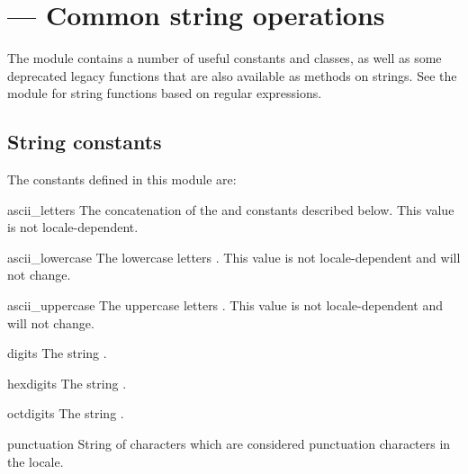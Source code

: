 \section{ ---
         Common string operations}


The  module contains a number of useful constants and classes,
as well as some deprecated legacy functions that are also available as methods
on strings.  See the module  for string
functions based on regular expressions.

\subsection{String constants}

The constants defined in this module are:

\begin{datadesc}{ascii\_letters}
  The concatenation of the  and
   constants described below.  This value is
  not locale-dependent.
\end{datadesc}

\begin{datadesc}{ascii\_lowercase}
  The lowercase letters .  This
  value is not locale-dependent and will not change.
\end{datadesc}

\begin{datadesc}{ascii\_uppercase}
  The uppercase letters .  This
  value is not locale-dependent and will not change.
\end{datadesc}

\begin{datadesc}{digits}
  The string .
\end{datadesc}

\begin{datadesc}{hexdigits}
  The string .
\end{datadesc}

\begin{datadesc}{octdigits}
  The string .
\end{datadesc}

\begin{datadesc}{punctuation}
  String of \ASCII{} characters which are considered punctuation
  characters in the  locale.
\end{datadesc}

